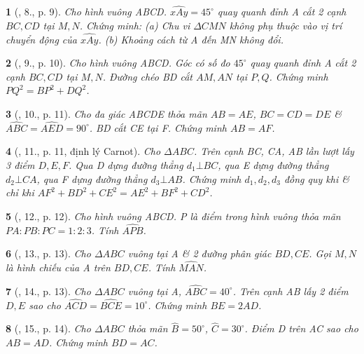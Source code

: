 \documentclass{article}
\newtheorem{baitoan}{}%
\begin{document}
\begin{baitoan}[\cite{Dang2018}, 8., p. 9]
	Cho hình vuông ABCD. $\widehat{xAy} = 45^\circ$ quay quanh đỉnh A cắt 2 cạnh $BC,CD$ tại $M,N$. Chứng minh: (a) Chu vi $\Delta CMN$ không phụ thuộc vào vị trí chuyển động của $\widehat{xAy}$. (b) Khoảng cách từ A đến MN không đổi.
\end{baitoan}

\begin{baitoan}[\cite{Dang2018}, 9., p. 10]
	Cho hình vuông ABCD. Góc có số đo $45^\circ$ quay quanh đỉnh A cắt 2 cạnh $BC,CD$ tại $M,N$. Đường chéo BD cắt $AM,AN$ tại $P,Q$. Chứng minh $PQ^2 = BP^2 + DQ^2$.
\end{baitoan}

\begin{baitoan}[\cite{Dang2018}, 10., p. 11]
	Cho đa giác ABCDE thỏa mãn $AB = AE$, $BC = CD = DE$ \& $\widehat{ABC} = \widehat{AED} = 90^\circ$. BD cắt CE tại F. Chứng minh $AB = AF$.
\end{baitoan}

\begin{baitoan}[\cite{Dang2018}, 11., p. 11, định lý Carnot]
	Cho $\Delta ABC$. Trên cạnh BC, CA, AB lần lượt lấy 3 điểm $D,E,F$. Qua D dựng đường thẳng $d_1\bot BC$, qua E dựng đường thẳng $d_2\bot CA$, qua F dựng đường thẳng $d_3\bot AB$. Chứng minh $d_1,d_2,d_3$ đồng quy khi \& chỉ khi $AF^2 + BD^2 + CE^2 = AE^2 + BF^2 + CD^2$.
\end{baitoan}

\begin{baitoan}[\cite{Dang2018}, 12., p. 12]
	Cho hình vuông ABCD. P là điểm trong hình vuông thỏa mãn $PA:PB:PC = 1:2:3$. Tính $\widehat{APB}$.
\end{baitoan}

\begin{baitoan}[\cite{Dang2018}, 13., p. 13]
	Cho $\Delta ABC$ vuông tại A \& 2 đường phân giác $BD,CE$. Gọi $M,N$ là hình chiếu của A trên $BD,CE$. Tính $\widehat{MAN}$.
\end{baitoan}

\begin{baitoan}[\cite{Dang2018}, 14., p. 13]
	Cho $\Delta ABC$ vuông tại A, $\widehat{ABC} = 40^\circ$. Trên cạnh AB lấy 2 điểm $D,E$ sao cho $\widehat{ACD} = \widehat{BCE} = 10^\circ$. Chứng minh $BE = 2AD$.
\end{baitoan}

\begin{baitoan}[\cite{Dang2018}, 15., p. 14]
	Cho $\Delta ABC$ thỏa mãn $\widehat{B} = 50^\circ$, $\widehat{C} = 30^\circ$. Điểm D trên AC sao cho $AB = AD$. Chứng minh $BD = AC$. 
\end{baitoan}
\end{document}
